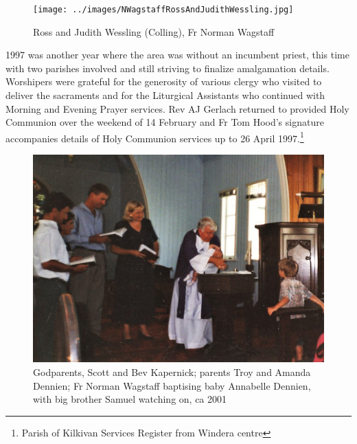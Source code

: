 \begin{figure}
\begin{center}
\texttt{[image: ../images/NWagstaffRossAndJudithWessling.jpg]}
\caption{Ross and Judith Wessling (Colling), Fr Norman Wagstaff }
\end{center}
\end{figure}




1997 was another year where the area was without an incumbent priest, this time with two parishes involved and still striving to finalize amalgamation details. Worshipers were grateful for the generosity of various clergy who visited to deliver the sacraments and for the Liturgical Assistants who continued with Morning and Evening Prayer services. Rev AJ Gerlach returned to provided Holy Communion over the weekend of 14 February and Fr Tom Hood's signature accompanies details of Holy Communion services up to 26 April 1997.\footnote{Parish of Kilkivan Services Register from Windera centre}








\begin{figure}[!htb]
\begin{center}
\includegraphics[width=1.\textwidth,center]{../images/baptism2001.jpg}
\caption{Godparents, Scott and Bev Kapernick; parents Troy and Amanda Dennien; Fr Norman Wagstaff baptising baby Annabelle Dennien, with big brother Samuel watching on, ca 2001}
\end{center}
\end{figure}




